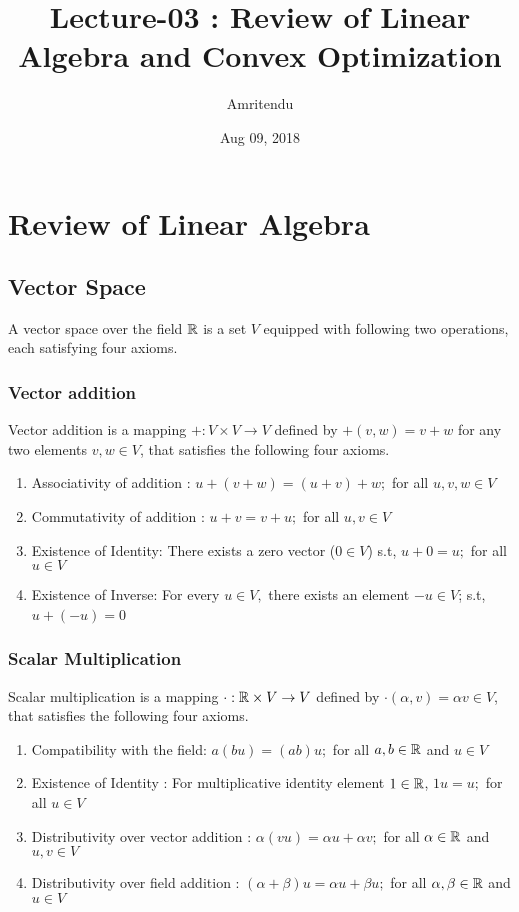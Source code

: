 \documentclass[a4paper,english,12pt]{article}
\title{Lecture-03 : Review of Linear Algebra and Convex Optimization}
\date{Aug 09, 2018}
\author{Amritendu}
\begin{document}
\maketitle
\section{Review of Linear Algebra}
\subsection{Vector Space}
A vector space over the field $\mathbb{R}$ is a set $V$ equipped with following two operations, each satisfying four axioms. 
\subsubsection{Vector addition}
Vector addition is a mapping $+: V \times V \to V$ defined by $+(v,w) = v+w$ for any two elements $v,w \in V$, 
that satisfies the following four axioms. 
\begin{enumerate}
\item Associativity of  addition : $u + (v + w) = (u + v) + w; $ for all $ u,v,w \in V$
\item Commutativity of addition : $u + v = v + u;  $ for all $ u,v \in V$
\item Existence of Identity: There exists a zero vector ($0 \in V$) s.t, $u+0=u; $ for all $ u\in V$
\item Existence of Inverse: For every $u \in V,$ there exists an element $-u\in V$; s.t, $u+(-u)=0$\
\end{enumerate}
\subsubsection{Scalar Multiplication}
Scalar multiplication is a mapping $\cdot : \mathbb{R} \times V \to V$ defined by $\cdot(\alpha, v) = \alpha v \in V$, 
that satisfies the following four axioms. 
\begin{enumerate}
\item Compatibility with the field: $a(bu)=(ab)u; $ for all $ a,b \in \mathbb{R}$ and $u\in V$
\item Existence of Identity : For multiplicative identity element $1 \in \mathbb{R}$, $1u=u; $ for all $ u\in V$
\item Distributivity over vector addition : $\alpha(vu)=\alpha u + \alpha v; $ for all $ \alpha \in \mathbb{R}$ and $u,v \in V$ 
\item Distributivity over field addition : $(\alpha+\beta)u=\alpha u + \beta u; $ for all $ \alpha,\beta \in \mathbb{R}$ and $u \in V$ 
\end{enumerate}
\end{document}

